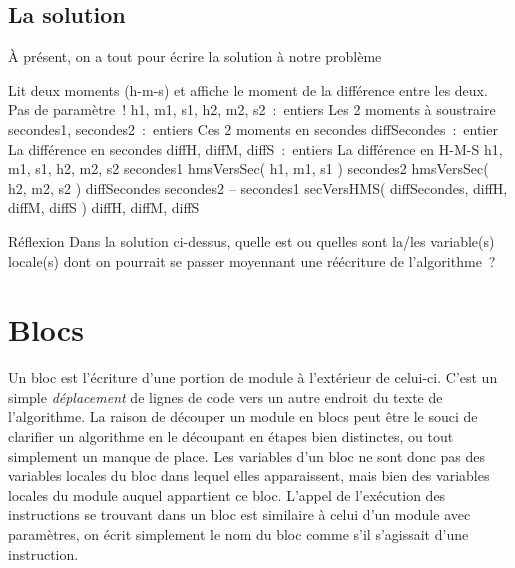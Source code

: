 	\subsection{La solution}
	
		À présent, on a tout pour écrire la solution à notre problème
	
		\begin{Pseudocode}
			\LComment Lit deux moments (h-m-s) et affiche le moment de la différence entre les deux.
			 \RComment Pas de paramètre~!
				\Decl h1, m1, s1, h2, m2, s2~:~entiers \RComment Les 2 moments à soustraire
				\Decl secondes1, secondes2~:~entiers \RComment Ces 2 moments en secondes
				\Decl diffSecondes~:~entier \RComment La différence en secondes
				\Decl diffH, diffM, diffS~:~entiers \RComment La différence en H-M-S
				\Read h1, m1, s1, h2, m2, s2
				\Let secondes1 \Gets hmsVersSec( h1, m1, s1 )
				\Let secondes2 \Gets hmsVersSec( h2, m2, s2 )
				\Let diffSecondes \Gets secondes2 – secondes1
				\Stmt secVersHMS( diffSecondes, diffH, diffM, diffS )
				\Write diffH, diffM, diffS
			\EndModule
		\end{Pseudocode}
	
		
		\begin{Emphase}[reflexion]{Réflexion}
			Dans la solution ci-dessus, 
			quelle est ou quelles sont la/les variable(s) locale(s) 
			dont on pourrait se passer moyennant une réécriture de
			l’algorithme~?
		\end{Emphase}
	
\section{Blocs}
	
	Un bloc est l’écriture d’une portion de module à l’extérieur de celui-ci. 
	C’est un simple \textit{déplacement} de lignes de code 
	vers un autre endroit du texte de l’algorithme. 
	La raison de découper un module en blocs peut être 
	le souci de clarifier un algorithme en le découpant en étapes
    bien distinctes, ou tout simplement un manque de place. 
    Les variables d’un bloc ne sont donc pas des variables locales 
    du bloc dans lequel elles apparaissent, 
    mais bien des variables locales du module auquel appartient ce bloc. 
    L’appel de l’exécution des instructions se trouvant
	dans un bloc est similaire à celui d’un module avec paramètres, 
	on écrit simplement le nom du bloc comme s’il s’agissait d’une
	instruction.

